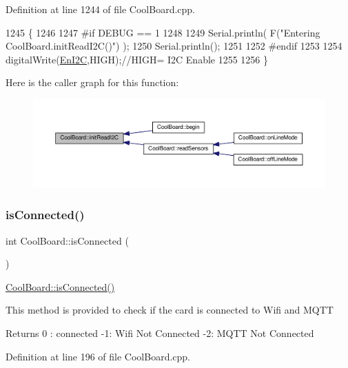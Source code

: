 Definition at line 1244 of file Cool\+Board.\+cpp.


\begin{DoxyCode}
1245 \{
1246 
1247 \textcolor{preprocessor}{#if DEBUG == 1}
1248 
1249     Serial.println( F(\textcolor{stringliteral}{"Entering CoolBoard.initReadI2C()"}) );
1250     Serial.println();
1251 
1252 \textcolor{preprocessor}{#endif}
1253  
1254     digitalWrite(\hyperlink{class_cool_board_af1fe1376fc66f93dee80b327ca695377}{EnI2C},HIGH);\textcolor{comment}{//HIGH= I2C Enable}
1255 
1256 \}
\end{DoxyCode}
Here is the caller graph for this function\+:\nopagebreak
\begin{figure}[H]
\begin{center}
\leavevmode
\includegraphics[width=350pt]{d7/df9/class_cool_board_a397b46fadab8f530a8cf4d914c561366_icgraph}
\end{center}
\end{figure}
\mbox{\label{class_cool_board_ad7442cf4b62c7b0d5bd62a0f75ffc065}} 
\subsubsection{\texorpdfstring{is\+Connected()}{isConnected()}}
{\footnotesize\ttfamily int Cool\+Board\+::is\+Connected (\begin{DoxyParamCaption}{ }\end{DoxyParamCaption})}

\hyperlink{class_cool_board_ad7442cf4b62c7b0d5bd62a0f75ffc065}{Cool\+Board\+::is\+Connected()}

This method is provided to check if the card is connected to Wifi and M\+Q\+TT

\begin{DoxyReturn}{Returns}
0 \+: connected -\/1\+: Wifi Not Connected -\/2\+: M\+Q\+TT Not Connected 
\end{DoxyReturn}


Definition at line 196 of file Cool\+Board.\+cpp.


